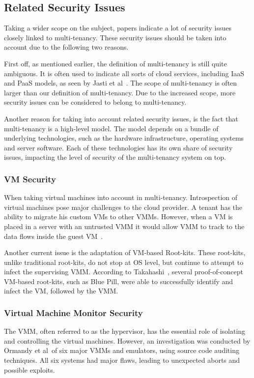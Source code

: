 \subsection{Related Security Issues}
Taking a wider scope on the subject, papers indicate a lot of security issues closely linked to multi-tenancy. 
These security issues should be taken into account due to the following two reasons.

First off, as mentioned earlier, the definition of multi-tenancy is still quite ambiguous. 
It is often used to indicate all sorts of cloud services, including IaaS and PaaS models, as seen by Jasti et al~\cite{Jasti2010Security}. 
The scope of multi-tenancy is often larger than our definition of multi-tenancy. Due to the increased scope, more security issues can be considered to belong to multi-tenancy.

Another reason for taking into account related security issues, is the fact that multi-tenancy is a high-level model. 
The model depends on a bundle of underlying technologies, such as the hardware infrastructure, operating systems and server software. 
Each of these technologies has its own share of security issues, impacting the level of security of the multi-tenancy system on top. 

\subsubsection{\acf{VM} Security}
When taking virtual machines into account in multi-tenancy. 
Introspection of virtual machines pose major challenges to the cloud provider. 
A tenant has the ability to migrate his custom \acp{VM} to other \acp{VMM}. 
However, when a \ac{VM} is placed in a server with an untrusted \ac{VMM} it would allow \ac{VMM} to track to the data flows inside the guest VM~\cite{Takahashi2012Security}.

Another current issue is the adaptation of VM-based Root-kits. 
These root-kits, unlike traditional root-kits, do not stop at OS level, but continue to attempt to infect the supervising \ac{VMM}. 
According to Takahashi~\cite{Takahashi2012Security}, several proof-of-concept VM-based root-kits, such as Blue Pill, were able to successfully identify and infect the VM, followed by the \ac{VMM}.

\subsubsection{Virtual Machine Monitor Security}
The \acl{VMM}, often referred to as the hypervisor, has the essential role of isolating and controlling the virtual machines. 
However, an investigation was conducted by Ormandy et al~\cite{Ormandy2007Security}of six major \acp{VMM} and emulators, using source code auditing techniques. All six systems had major flaws, leading to unexpected aborts and possible exploits.


